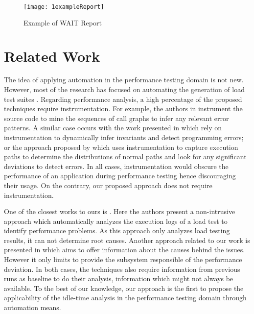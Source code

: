 \documentclass[runningheads,a4paper]{llncs}
\begin{document}
\begin{figure}[!h]
\centering
\texttt{[image: 1exampleReport]}
\caption{Example of WAIT Report}
\label{fig_WAITReport}
\end{figure}

\vspace{-10pt}
\section{Related Work}
\vspace{-5pt}
The idea of applying automation in the performance testing domain is not new.
However, most of the research has focused on automating the generation of load
test suites
\cite{Chen1,Elvira1,Zhang1,Briand1,Bayan1,Avritzer2,Avritzer3,Garousi1}.
Regarding performance analysis, a high percentage of the proposed
techniques require instrumentation. For example, the authors in \cite{Yang1}
instrument the source code to mine the sequences of call graphs to infer any
relevant error patterns. A similar case occurs with the work presented in
\cite{Hangal1,Csallner1} which rely on instrumentation to dynamically infer
invariants and detect programming errors; or the approach proposed by
\cite{Chen2} which uses instrumentation to capture execution paths to determine
the distributions of normal paths and look for any significant deviations to
detect errors. In all cases, instrumentation would obscure the performance of an
application during performance testing hence discouraging their usage. On the
contrary, our proposed approach does not require instrumentation.

One of the closest works to ours is \cite{Jiang2009}. Here the authors present a
non-intrusive approach which automatically analyzes the execution logs of a load
test to identify performance problems. As this approach only analyzes load
testing results, it can not determine root causes. Another approach related
to our work is presented in \cite{Malik1} which aims to offer information about
the causes behind the issues. However it only limits to provide the subsystem
responsible of the performance deviation. In both cases, the techniques also
require information from previous runs as baseline to do their analysis,
information which might not always be available. To the best of our knowledge,
our approach is the first to propose the applicability of the idle-time analysis
in the performance testing domain through automation means.
\end{document}
